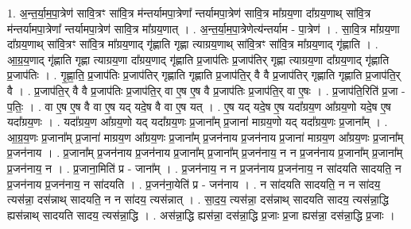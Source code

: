 \documentclass[17pt]{extarticle}
\begin{document}
1. अ॒न्त॒र्या॒म॒पा॒त्रेण॑ सावि॒त्रꣳ सा॑वि॒त्र म॑न्तर्यामपा॒त्रेणा᳚ न्तर्यामपा॒त्रेण॑ सावि॒त्र मा᳚ग्रय॒णा दा᳚ग्रय॒णाथ् सा॑वि॒त्र म॑न्तर्यामपा॒त्रेणा᳚ न्तर्यामपा॒त्रेण॑ सावि॒त्र मा᳚ग्रय॒णात् । . अ॒न्त॒र्या॒म॒पा॒त्रेणेत्य॑न्तर्याम - पा॒त्रेण॑ । . सा॒वि॒त्र मा᳚ग्रय॒णा दा᳚ग्रय॒णाथ् सा॑वि॒त्रꣳ सा॑वि॒त्र मा᳚ग्रय॒णाद् गृ॑ह्णाति गृह्णा त्याग्रय॒णाथ् सा॑वि॒त्रꣳ सा॑वि॒त्र मा᳚ग्रय॒णाद् गृ॑ह्णाति । . आ॒ग्र॒य॒णाद् गृ॑ह्णाति गृह्णा त्याग्रय॒णा दा᳚ग्रय॒णाद् गृ॑ह्णाति प्र॒जाप॑तिः प्र॒जाप॑तिर् गृह्णा त्याग्रय॒णा दा᳚ग्रय॒णाद् गृ॑ह्णाति प्र॒जाप॑तिः । . गृ॒ह्णा॒ति॒ प्र॒जाप॑तिः प्र॒जाप॑तिर् गृह्णाति गृह्णाति प्र॒जाप॑ति॒र् वै वै प्र॒जाप॑तिर् गृह्णाति गृह्णाति प्र॒जाप॑ति॒र् वै । . प्र॒जाप॑ति॒र् वै वै प्र॒जाप॑तिः प्र॒जाप॑ति॒र् वा ए॒ष ए॒ष वै प्र॒जाप॑तिः प्र॒जाप॑ति॒र् वा ए॒षः । . प्र॒जाप॑ति॒रिति॑ प्र॒जा - प॒तिः॒ । . वा ए॒ष ए॒ष वै वा ए॒ष यद् यदे॒ष वै वा ए॒ष यत् । . ए॒ष यद् यदे॒ष ए॒ष यदा᳚ग्रय॒ण आ᳚ग्रय॒णो यदे॒ष ए॒ष यदा᳚ग्रय॒णः । . यदा᳚ग्रय॒ण आ᳚ग्रय॒णो यद् यदा᳚ग्रय॒णः प्र॒जाना᳚म् प्र॒जाना॑ माग्रय॒णो यद् यदा᳚ग्रय॒णः प्र॒जाना᳚म् । . आ॒ग्र॒य॒णः प्र॒जाना᳚म् प्र॒जाना॑ माग्रय॒ण आ᳚ग्रय॒णः प्र॒जाना᳚म् प्र॒जन॑नाय प्र॒जन॑नाय प्र॒जाना॑ माग्रय॒ण आ᳚ग्रय॒णः प्र॒जाना᳚म् प्र॒जन॑नाय । . प्र॒जाना᳚म् प्र॒जन॑नाय प्र॒जन॑नाय प्र॒जाना᳚म् प्र॒जाना᳚म् प्र॒जन॑नाय॒ न न प्र॒जन॑नाय प्र॒जाना᳚म् प्र॒जाना᳚म् प्र॒जन॑नाय॒ न । . प्र॒जाना॒मिति॑ प्र - जाना᳚म् । . प्र॒जन॑नाय॒ न न प्र॒जन॑नाय प्र॒जन॑नाय॒ न सा॑दयति सादयति॒ न प्र॒जन॑नाय प्र॒जन॑नाय॒ न सा॑दयति । . प्र॒जन॑ना॒येति॑ प्र - जन॑नाय । . न सा॑दयति सादयति॒ न न सा॑दय॒ त्यस॑न्ना॒ दस॑न्नाथ् सादयति॒ न न सा॑दय॒ त्यस॑न्नात् । . सा॒द॒य॒ त्यस॑न्ना॒ दस॑न्नाथ् सादयति सादय॒ त्यस॑न्ना॒द्धि ह्यस॑न्नाथ् सादयति सादय॒ त्यस॑न्ना॒द्धि । . अस॑न्ना॒द्धि ह्यस॑न्ना॒ दस॑न्ना॒द्धि प्र॒जाः प्र॒जा ह्यस॑न्ना॒ दस॑न्ना॒द्धि प्र॒जाः । \newline
\end{document}
